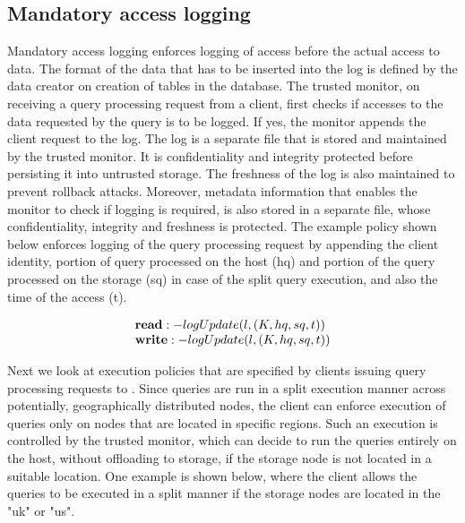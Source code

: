 \subsection{Mandatory access logging}
\label{sec:use-case-mal}

Mandatory access logging enforces logging of access before the actual access to data. The format of the data that has to be inserted into the log is defined by the data creator on creation of tables in the database. The trusted monitor, on receiving a query processing request from a client, first checks if accesses to the data requested by the query is to be logged. If yes, the monitor appends the client request to the log. The log is a separate file that is stored and maintained by the trusted monitor. It is confidentiality and integrity protected before persisting it into untrusted storage. The freshness of the log is also maintained to prevent rollback attacks. Moreover, metadata information that enables the monitor to check if logging is required, is also stored in a separate file, whose confidentiality, integrity and freshness is protected. The example policy shown below enforces logging of the query processing request by appending the client identity, portion of query processed on the host (hq) and portion of the query processed on the storage (sq) in case of the split query execution, and also the time of the access (t).

\[
 \begin{array}{@{}l@{}}
 \textbf{read}:-logUpdate (l, (K, hq, sq, t))\\
 \textbf{write}:-logUpdate (l, (K, hq, sq, t))\\
 \end{array}
\]
\fi

Next we look at execution policies that are specified by clients issuing query processing requests to \project{}. Since queries are run in a split execution manner across potentially, geographically distributed nodes, the client can enforce execution of queries only on nodes that are located in specific regions. Such an execution is controlled by the trusted monitor, which can decide to run the queries entirely on the host, without offloading to storage, if the storage node is not located in a suitable location. One example is shown below, where the client allows the queries to be executed in a split manner if the storage nodes are located in the "uk" or "us".

